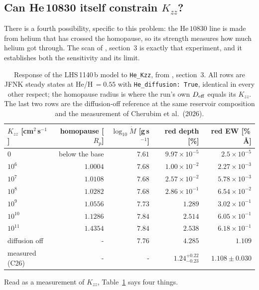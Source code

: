 \documentclass[english,a4paper]{my_memo}
\begin{document}
\subsection{Can He\,10830 itself constrain $K_{zz}$?}
\label{sec:he-constraint}

There is a fourth possibility, specific to this problem: the He\,$10830$
line is made from helium that has crossed the homopause, so its strength
measures how much helium got through. The scan of
, section~3 is exactly that experiment,
and it establishes both the sensitivity and its limit.

\begin{table}[htbp]\centering
\caption{Response of the LHS\,1140\,b model to \texttt{He\_Kzz}, from
\protect{}, section~3. All rows are JFNK steady
states at He/H\,$=0.55$ with \texttt{He\_diffusion: True}, identical in
every other respect; the homopause radius is where the run's own
$D_{\rm eff}$ equals its $K_{zz}$. The last two rows are the
diffusion-off reference at the same reservoir composition and the
measurement of Cherubim et al.\ (2026).}
\label{tab:scan}
\begin{tabular}{lrrrr}
\toprule
$K_{zz}$ [cm$^{2}$\,s$^{-1}$] & homopause [$R_p$] &
$\log_{10}\dot M$ [g\,s$^{-1}$] & red depth [\%] & red EW [\%\,\AA] \\
\midrule
$0$        & below the base & $7.61$ & $9.97\times10^{-5}$ & $2.5\times10^{-5}$ \\
$10^{6}$   & $1.0004$ & $7.68$ & $1.00\times10^{-2}$ & $2.27\times10^{-3}$ \\
$10^{7}$   & $1.0108$ & $7.68$ & $2.57\times10^{-2}$ & $5.78\times10^{-3}$ \\
$10^{8}$   & $1.0282$ & $7.68$ & $2.86\times10^{-1}$ & $6.54\times10^{-2}$ \\
$10^{9}$   & $1.0556$ & $7.73$ & $1.289$ & $3.02\times10^{-1}$ \\
$10^{10}$  & $1.1286$ & $7.84$ & $2.514$ & $6.05\times10^{-1}$ \\
$10^{11}$  & $1.4354$ & $7.84$ & $2.538$ & $6.18\times10^{-1}$ \\
\midrule
diffusion off & - & $7.76$ & $4.285$ & $1.109$ \\
measured (C26) & - & - & $1.24^{+0.22}_{-0.23}$ & $1.108 \pm 0.030$ \\
\bottomrule
\end{tabular}
\end{table}

Read as a measurement of $K_{zz}$, Table~\ref{tab:scan} says four things.
\end{document}
